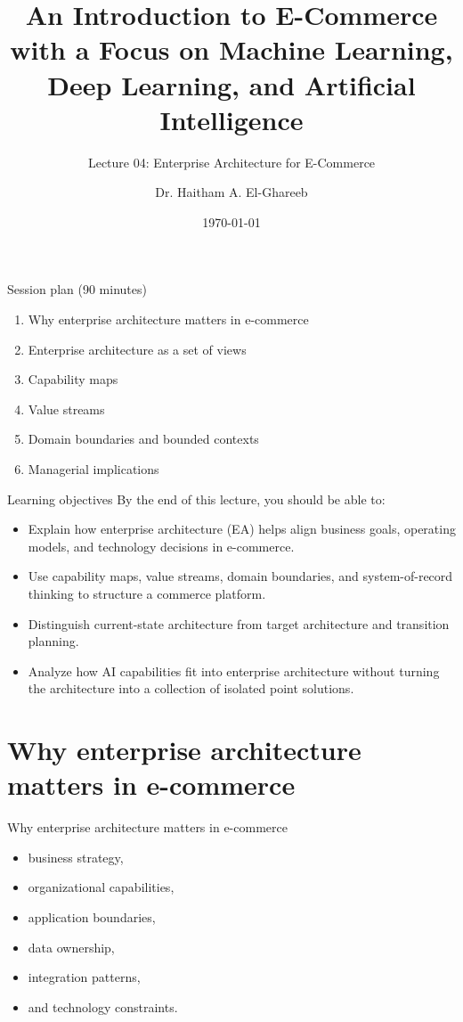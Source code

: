 \documentclass[aspectratio=169]{beamer}
\title[Lecture 04]{An Introduction to E-Commerce\\\small with a Focus on Machine Learning, Deep Learning, and Artificial Intelligence}
\subtitle{Lecture 04: Enterprise Architecture for E-Commerce}
\author{Dr. Haitham A. El-Ghareeb}
\institute{Faculty of Computers and Information Sciences \\ Mansoura University \\ Egypt}
\date{\today}
\begin{document}
\begin{frame}
  \titlepage
\end{frame}

\begin{frame}{Session plan (90 minutes)}
  \begin{enumerate}
    \item Why enterprise architecture matters in e-commerce
    \item Enterprise architecture as a set of views
    \item Capability maps
    \item Value streams
    \item Domain boundaries and bounded contexts
    \item Managerial implications
  \end{enumerate}
\end{frame}

\begin{frame}{Learning objectives}
  By the end of this lecture, you should be able to:
  \begin{itemize}
    \item Explain how enterprise architecture (EA) helps align business goals, operating models, and technology decisions in e-commerce.
    \item Use capability maps, value streams, domain boundaries, and system-of-record thinking to structure a commerce platform.
    \item Distinguish current-state architecture from target architecture and transition planning.
    \item Analyze how AI capabilities fit into enterprise architecture without turning the architecture into a collection of isolated point solutions.
  \end{itemize}
\end{frame}

\section{Why enterprise architecture matters in e-commerce}

\begin{frame}{Why enterprise architecture matters in e-commerce}
  \begin{itemize}
    \item business strategy,
    \item organizational capabilities,
    \item application boundaries,
    \item data ownership,
    \item integration patterns,
    \item and technology constraints.
  \end{itemize}
\end{frame}
\end{document}
